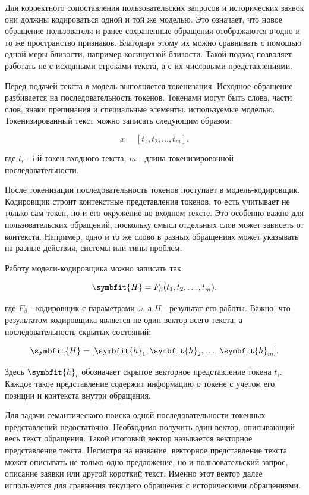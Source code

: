 \documentclass[14pt,a4paper]{extarticle}
\numberwithin{figure}{section}
\numberwithin{table}{section}
\begin{document}
Для корректного сопоставления пользовательских запросов и исторических
заявок они должны кодироваться одной и той же моделью. Это означает, что
новое обращение пользователя и ранее сохраненные обращения отображаются
в одно и то же пространство признаков. Благодаря этому их можно
сравнивать с помощью одной меры близости, например косинусной близости.
Такой подход позволяет работать не с исходными строками текста, а с их
числовыми представлениями.

Перед подачей текста в модель выполняется токенизация. Исходное
обращение разбивается на последовательность токенов. Токенами могут быть
слова, части слов, знаки препинания и специальные элементы, используемые
моделью. Токенизированный текст можно записать следующим образом:

\begin{equation}x=[t_1,t_2,\ldots,t_m].\end{equation}

где \(t_{i}\) - i-й токен входного текста, \(m\) - длина
токенизированной последовательности.

После токенизации последовательность токенов поступает в модель-кодировщик.
Кодировщик строит контекстные представления токенов, то есть учитывает не
только сам токен, но и его окружение во входном тексте. Это особенно
важно для пользовательских обращений, поскольку смысл отдельных слов
может зависеть от контекста. Например, одно и то же слово в разных
обращениях может указывать на разные действия, системы или типы проблем.

Работу модели-кодировщика можно записать так:

\begin{equation}\symbfit{H}=F_{\beta}(t_1,t_2,\ldots,t_m).\end{equation}

где \(F_{\beta}\) - кодировщик с параметрами \(\omega\), а \(H\) -
результат его работы. Важно, что результатом кодировщика является не один
вектор всего текста, а последовательность скрытых состояний:

\begin{equation}\symbfit{H}=[\symbfit{h}_1,\symbfit{h}_2,\ldots,\symbfit{h}_m].\end{equation}

Здесь \(\symbfit{h}_i\) обозначает скрытое векторное представление токена
\(t_i\). Каждое такое представление содержит информацию о токене с
учетом его позиции и контекста внутри обращения.

Для задачи семантического поиска одной последовательности токенных
представлений недостаточно. Необходимо получить один вектор, описывающий
весь текст обращения. Такой итоговый вектор называется векторное представление текста. Несмотря на название, векторное представление текста может описывать не
только одно предложение, но и пользовательский запрос, описание заявки
или другой короткий текст. Именно этот вектор далее используется для
сравнения текущего обращения с историческими обращениями.
\end{document}
